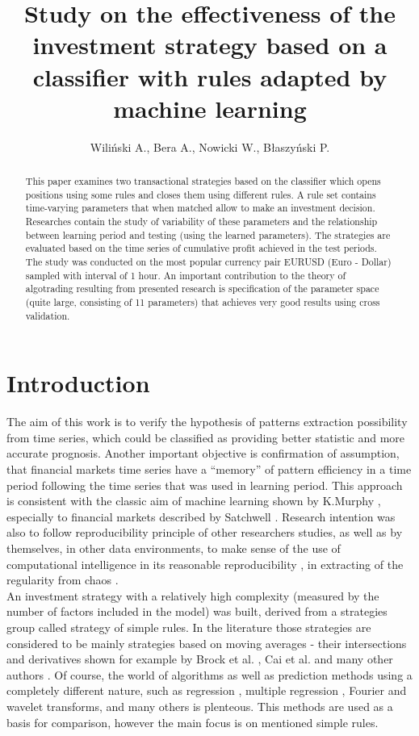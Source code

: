 \documentclass{tewiart}
\title{Study on the effectiveness of the investment strategy based on a classifier with rules adapted by machine learning}
\author{Wiliński A.\inst{1}, Bera A.\inst{1}, Nowicki W.\inst{1}, Błaszyński P.\inst{1}}
\affiliation{%
  \inst{1}West Pomeranian University of Technology, Żołnierska 49, 71-210 Szczecin, Poland\\
  \{awilinski, abera, wnowicki, pblaszynski\}@wi.zut.edu.pl
}
\begin{document}
\maketitle

\begin{abstract}
This paper examines two transactional strategies based on the classifier which opens positions using some rules and closes them using different rules. A rule set contains time-varying parameters that when matched allow to make an investment decision. Researches contain the study of variability of these parameters and the relationship between learning period and testing (using the learned parameters). The strategies are evaluated based on the time series of cumulative profit achieved in the test periods. The study was conducted on the most popular currency pair EURUSD (Euro - Dollar) sampled with interval of 1 hour. An important contribution to the theory of algotrading resulting from presented research is specification of the parameter space (quite large, consisting of 11 parameters) that achieves very good results using cross validation. 
\end{abstract}

\section{Introduction}
The aim of this work is to verify the hypothesis of patterns extraction possibility from time series, which could be classified as providing better statistic and more accurate prognosis. Another important objective is confirmation of assumption, that financial markets time series have a “memory” of pattern efficiency in a time period following the time series that was used in learning period. This approach is consistent with the classic aim of machine learning shown by K.Murphy \cite{Murphy}, especially to financial markets described by Satchwell \cite{Satchwell}. Research intention was also to follow reproducibility principle of other researchers studies, as well as by themselves, in other data environments, to make sense of the use of computational intelligence in its reasonable reproducibility \cite{Polya, Donoho}, in extracting of the regularity from chaos \cite{Ball, Pedrycz}.\\

An investment strategy with a relatively high complexity (measured by the number of factors included in the model) was built, derived from a strategies group called strategy of simple rules. In the literature those strategies are considered to be mainly strategies based on moving averages - their intersections and derivatives shown for example by Brock et al. \cite{Brock}, Cai et al. \cite{Cai} and many other authors \cite{Gencay, LeBaron, Tian}. Of course, the world of algorithms as well as prediction methods using a completely different nature, such as regression \cite{Muriel}, multiple regression \cite{Wilinski, Fujimoto}, Fourier and wavelet transforms, and many others \cite{Raghuraj, KleskWilinski} is plenteous. This methods are used as a basis for comparison, however the main focus is on mentioned simple rules.\\
\end{document}
